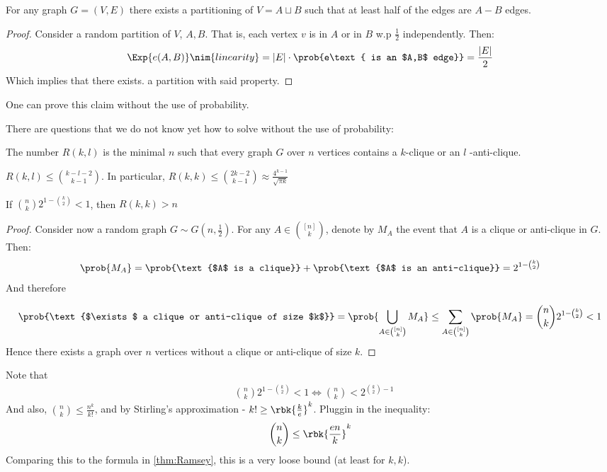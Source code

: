 \documentclass[a4paper, 11pt, oneside]{book}
\begin{document}
\begin{claim}
	For any graph $G = (V,E)$ there exists a partitioning of $V = A\sqcup B$ such that at least half of the edges are $A-B$ edges.
\end{claim}
\begin{proof}
	Consider a random partition of $V$, $A,B$. That is, each vertex $v$ is in $A$ or in $B$ w.p $\frac{1}{2}$ independently. Then:
	\[
	\Exp{e(A,B)} \nim{linearity}= |E|\cdot \prob{e\text{ is an $A,B$ edge}} = \frac{|E|}{2}
	\]
	Which implies that there exists. a partition with said property.
\end{proof}
\begin{remark}
One can prove this claim without the use of probability.	
\end{remark}
There are questions that we do not know yet how to solve without the use of probability:
\begin{yellowBox}
\begin{defn}
	 The number $R(k,l)$ is the minimal $n$ such that every graph $G$ over $n$ vertices contains a $k$-clique or an $l$ -anti-clique.
\end{defn}	
\end{yellowBox}
\begin{thm}[Ramsey]\label{thm:Ramsey} $R(k,l)\le {k-l-2\choose k-1}$. In particular, $R(k,k)\le {2k-2\choose k-1} \approx \frac{4^{k-1}}{\sqrt{\pi k}}$
	
\end{thm}
\begin{thm}\label{thm:Lower Bound Ramsey}
	If ${n \choose k}2^{1-{k\choose 2}} < 1$, then $R(k,k) > n$
\end{thm}
\begin{proof}  Consider now a random graph $G\sim G(n,\frac{1}{2})$. For any $A\in {[n]\choose k}$, denote by $M_A$ the event that $A$ is a clique or anti-clique in $G$. Then:
	\[
	\prob{M_A} = \prob{\text{$A$ is a clique}} + \prob{\text{$A$ is an anti-clique}} = 2^{1-{k\choose 2}}
	\]
	And therefore
	
	\[
	\prob{\text{$\exists$ a clique or anti-clique of size $k$}} = \prob{\bigcup_{A\in {[n]\choose k}} M_A }\le \sum_{A\in {[n]\choose k}} \prob{M_A} = {n\choose k} 2^{1-{k\choose 2}} < 1
	\]
	Hence there exists a graph over $n$ vertices without a clique or anti-clique of size $k$.
\end{proof}
\begin{remark}
Note that
	\begin{align*}
		& {n \choose k}2^{1-{k\choose 2}} < 1 \iff {n \choose k} < 2^{{k\choose 2} - 1}
	\end{align*}
	And also, ${n\choose k} \le \frac{n^k}{k!}$, and by Stirling's approximation - $k! \ge \rbk{\frac{k}{e}}^k$. Pluggin in the inequality:
	\[
	{n\choose k} \le \rbk{\frac{en}{k}}^k
	\]
Comparing this to the formula in \ref{thm:Ramsey}, this is a very loose bound (at least for $k,k$).
\end{remark}
\end{document}
